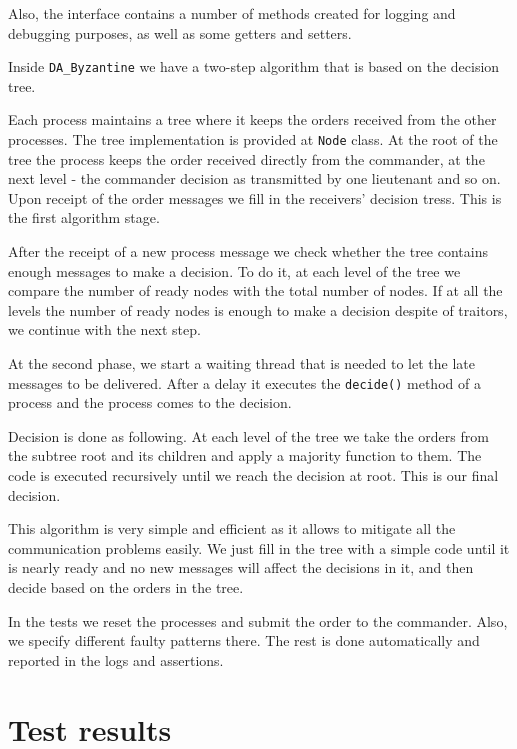 \documentclass[a4paper, notitlepage]{article}
\begin{document}
Also, the interface contains a number of methods created for logging and debugging purposes, as well as some getters and setters.

Inside \lstinline{DA_Byzantine} we have a two-step algorithm that is based on the decision tree.

Each process maintains a tree where it keeps the orders received from the other processes. The tree implementation is provided at \lstinline{Node} class. At the root of the tree the process keeps the order received directly from the commander, at the next level - the commander decision as transmitted by one lieutenant and so on. Upon receipt of the order messages we fill in the receivers' decision tress. This is the first algorithm stage.

After the receipt of a new process message we check whether the tree contains enough messages to make a decision. To do it, at each level of the tree we compare the number of ready nodes with the total number of nodes. If at all the levels the number of ready nodes is enough to make a decision despite of traitors, we continue with the next step.

At the second phase, we start a waiting thread that is needed to let the late messages to be delivered. After a delay it executes the \lstinline{decide()} method of a process and the process comes to the decision. 

Decision is done as following. At each level of the tree we take the orders from the subtree root and its children and apply a majority function to them. The code is executed recursively until we reach the decision at root. This is our final decision.

This algorithm is very simple and efficient as it allows to mitigate all the communication problems easily. We just fill in the tree with a simple code until it is nearly ready and no new messages will affect the decisions in it, and then decide based on the orders in the tree.

In the tests we reset the processes and submit the order to the commander. Also, we specify different faulty patterns there. The rest is done automatically and reported in the logs and assertions.

\section{Test results}
\end{document}
